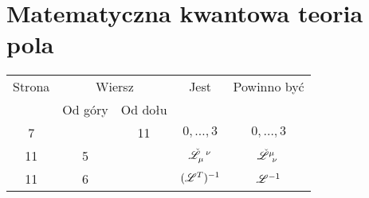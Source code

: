 \documentclass[a4paper,11pt]{article}
\begin{document}
\vspace{\spaceTwo}


\noindent













\newpage

\section{Matematyczna kwantowa teoria pola}

\vspace{\spaceTwo}




\vspace{0em}



\vspace{0em}






\begin{center}

  \begin{tabular}{|c|c|c|c|c|}
    \hline
    Strona & \multicolumn{2}{c|}{Wiersz} & Jest
                              & Powinno być \\ \cline{2-3}
    & Od góry & Od dołu & & \\
    \hline
    7   & & 11 & $0,\ldots,\!3$ & $0, \ldots, 3$ \\
    11  &  5 & & $\tensor{ \check{ \Lcal } }{ _{ \mu }^{ \nu } }$
           & $\tensor{ \check{ \Lcal } }{ ^{ \mu }_{ \nu } }$ \\
    11  &  6 & & $( \mathcal{L}^{ T } )^{ -1 }$ & $\mathcal{L}^{ -1 }$ \\
    \hline
  \end{tabular}

\end{center}
\end{document}
